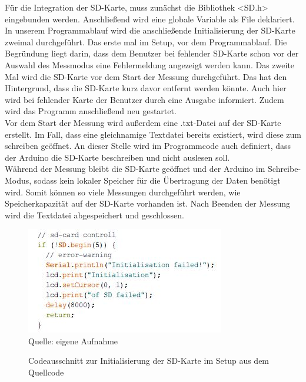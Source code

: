 Für die Integration der SD-Karte, muss zunächst die Bibliothek <SD.h> eingebunden werden. Anschließend wird eine globale Variable als File deklariert. In unserem Programmablauf wird die anschließende Initialisierung der SD-Karte zweimal durchgeführt. Das erste mal im Setup, vor dem Programmablauf. Die Begründung liegt darin, dass dem Benutzer bei fehlender SD-Karte schon vor der Auswahl des Messmodus eine Fehlermeldung angezeigt werden kann. Das zweite Mal wird die SD-Karte vor dem Start der Messung durchgeführt. Das hat den Hintergrund, dass die SD-Karte kurz davor entfernt werden könnte. Auch hier wird bei fehlender Karte der Benutzer durch eine Ausgabe informiert. Zudem wird das Programm anschließend neu gestartet. \\
Vor dem Start der Messung wird außerdem eine .txt-Datei auf der SD-Karte erstellt. Im Fall, dass eine gleichnamige Textdatei bereits existiert, wird diese zum schreiben geöffnet. An dieser Stelle wird im Programmcode auch definiert, dass der Arduino die SD-Karte beschreiben und nicht auslesen soll. \\
Während der Messung bleibt die SD-Karte geöffnet und der Arduino im Schreibe-Modus, sodass kein lokaler Speicher für die Übertragung der Daten benötigt wird. Somit können so viele Messungen durchgeführt werden, wie Speicherkapazität auf der SD-Karte vorhanden ist. Nach Beenden der Messung wird die Textdatei abgespeichert und geschlossen. \\

\begin{figure}[!hbt]
	\centering
	\includegraphics[width=0.6\linewidth]{Images/sdSetup}
	\footnotesize{\\ Quelle: eigene Aufnahme}
	\caption{Codeausschnitt zur Initialisierung der SD-Karte im Setup aus dem Quellcode}
	\label{fig:SD_Setup}
\end{figure}

